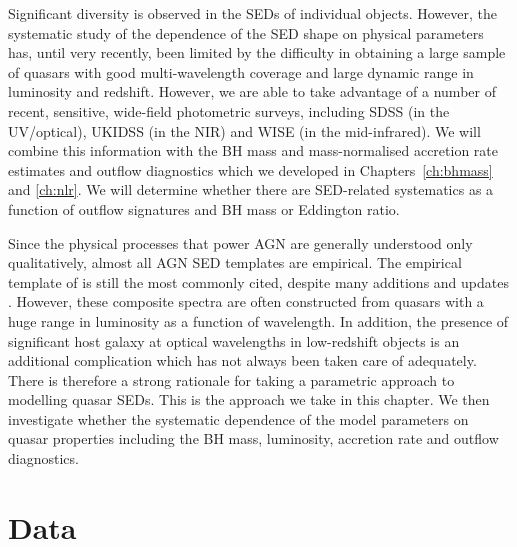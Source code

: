Significant diversity is observed in the SEDs of individual objects. 
However, the systematic study of the dependence of the SED shape on physical parameters has, until very recently, been limited by the difficulty in obtaining a large sample of quasars with good multi-wavelength coverage and large dynamic range in luminosity and redshift. 
However, we are able to take advantage of a number of recent, sensitive, wide-field photometric surveys, including SDSS (in the UV/optical), UKIDSS (in the NIR) and WISE (in the mid-infrared).
We will combine this information with the BH mass and mass-normalised accretion rate estimates and outflow diagnostics which we developed in Chapters~\ref{ch:bhmass} and \ref{ch:nlr}. 
We will determine whether there are SED-related systematics as a function of outflow signatures and BH mass or Eddington ratio. 

Since the physical processes that power AGN are generally understood only qualitatively, almost all AGN SED templates are empirical. 
The empirical template of \citet{elvis94} is still the most commonly cited, despite many additions and updates \citep[e.g.][]{polletta00, kuraszkiewicz03, risaliti04, richards06,  polletta07, lusso10, shang11, marchese12, trichas12}. 
However, these composite spectra are often constructed from quasars with a huge range in luminosity as a function of wavelength. 
In addition, the presence of significant host galaxy at optical wavelengths in low-redshift objects is an additional complication which has not always been taken care of adequately. 
There is therefore a strong rationale for taking a parametric approach to modelling quasar SEDs. 
This is the approach we take in this chapter. 
We then investigate whether the systematic dependence of the model parameters on quasar properties including the BH mass, luminosity, accretion rate and outflow diagnostics. 

\section{Data}

